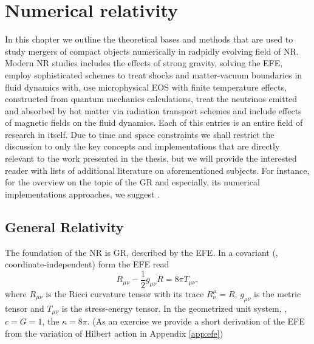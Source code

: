 
\chapter{Numerical relativity} %

\label{ch:nr_methods} %


In this chapter we outline the theoretical bases and methods that are used to study 
mergers of compact objects numerically in radpidly evolving field of \ac{NR}.
%
Modern \ac{NR} studies includes the effects of strong gravity, solving the \ac{EFE},
employ sophisticated schemes to treat shocks and matter-vacuum boundaries in fluid dynamics with, 
use microphysical \ac{EOS} with finite temperature effects, constructed from quantum mechanics 
calculations, treat the neutrinos emitted and absorbed by hot matter via radiation transport 
schemes and include effects of magnetic fields on the fluid dynamics. 
%
Each of this entries is an entire field of research in itself. Due to time and space constraints
we shall restrict the discussion to only the key concepts and implementations that are directly 
relevant to the work presented in the thesis, but we will provide the interested reader with 
lists of additional literature on aforementioned subjects. 
For instance, for the overview on the topic of the \ac{GR} and especially, its numerical 
implementations approaches, 
we suggest \citet{Arnowitt:1962hi,Landau:1982dva,Wald:1984,Misner:1973,Baumgarte:2002jm}.


\section{General Relativity}

The foundation of the \ac{NR} is \ac{GR}, described by the \ac{EFE}. 
In a covariant (\ie, coordinate-independent) form the \ac{EFE} read
%
\begin{equation}
R_{\mu\nu} -\frac{1}{2}g_{\mu\nu}R=8 \pi T_{\mu\nu},
\label{eq:theory:EFE}
\end{equation}
%
where $R_{\mu\nu}$ is the Ricci curvature tensor with its trace 
$R^{\mu}_{\nu} = R$, $g_{\mu\nu}$ is the metric tensor and 
$T_{\mu\nu}$ is the stress-energy tensor.
%
In the geometrized unit system, \ie, $c=G=1$, the $\kappa=8\pi$.
(As an exercise we provide a short derivation of the 
\ac{EFE} from the variation of Hilbert action in Appendix \ref{app:efe})

